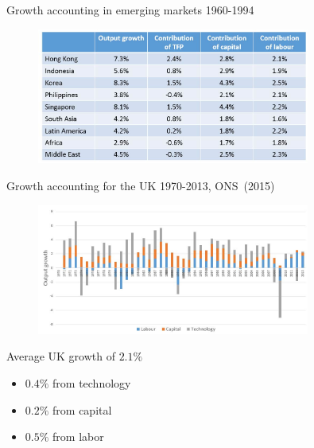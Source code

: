 
\begin{frame}{Growth accounting in emerging markets 1960-1994}
\begin{figure}
\centering
\label{fig:growth_decomp}
\includegraphics[width=0.8\textwidth]{Figures/growth_decomp.JPG}
\end{figure}
\end{frame}


\begin{frame}{Growth accounting for the UK 1970-2013, ONS\ (2015)}

\begin{figure}
\centering
\label{fig:growth_decomp}
\includegraphics[width=0.8\textwidth]{Figures/growth_decomp_chart.JPG}
\end{figure}

Average UK growth of $2.1\%$
	\begin{itemize}
	\item	$0.4\%$ from technology
	\item	$0.2\%$ from capital
	\item	$0.5\%$ from labor
	\end{itemize}

\end{frame}
